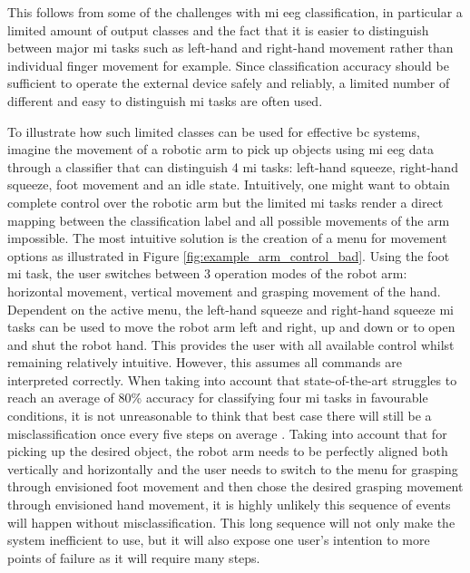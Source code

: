 This follows from some of the challenges with \gls{mi} \gls{eeg} classification, in particular a limited amount of output classes and the fact that it is easier to distinguish between major \gls{mi} tasks such as left-hand and right-hand movement rather than individual finger movement for example.
Since classification accuracy should be sufficient to operate the external device safely and reliably, a limited number of different and easy to distinguish \gls{mi} tasks are often used.

To illustrate how such limited classes can be used for effective \gls{bc} systems, imagine the movement of a robotic arm to pick up objects using \gls{mi} \gls{eeg} data through a classifier that can distinguish 4 \gls{mi} tasks: left-hand squeeze, right-hand squeeze, foot movement and an idle state.
Intuitively, one might want to obtain complete control over the robotic arm but the limited \gls{mi} tasks render a direct mapping between the classification label and all possible movements of the arm impossible.
The most intuitive solution is the creation of a menu for movement options as illustrated in Figure \ref{fig:example_arm_control_bad}.
Using the foot \gls{mi} task, the user switches between 3 operation modes of the robot arm: horizontal movement, vertical movement and grasping movement of the hand.
Dependent on the active menu, the left-hand squeeze and right-hand squeeze \gls{mi} tasks can be used to move the robot arm left and right, up and down or to open and shut the robot hand.
This provides the user with all available control whilst remaining relatively intuitive.
However, this assumes all commands are interpreted correctly.
When taking into account that state-of-the-art struggles to reach an average of 80\% accuracy for classifying four \gls{mi} tasks in favourable conditions, it is not unreasonable to think that best case there will still be a misclassification once every five steps on average \citep{four_class_mi_CSP_good, four_class_mi_hybrid_good, four_class_mi_klrrm_good, four_class_mi_wavelet_good}.
Taking into account that for picking up the desired object, the robot arm needs to be perfectly aligned both vertically and horizontally and the user needs to switch to the menu for grasping through envisioned foot movement and then chose the desired grasping movement through envisioned hand movement, it is highly unlikely this sequence of events will happen without misclassification.
This long sequence will not only make the system inefficient to use, but it will also expose one user's intention to more points of failure as it will require many steps.

